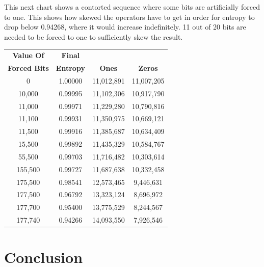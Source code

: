 \documentclass[letterpaper]{article}
\begin{document}
\begin{multicols}{2}
    This next chart shows a contorted sequence where some bits are artificially forced to one. This shows how skewed the operators have to get in order for entropy to drop below 0.94268, where it would increase indefinitely. 11 out of 20 bits are needed to be forced to one to sufficiently skew the result.

    \noindent
    \begin{minipage}{\columnwidth}
        \setlength{\tabcolsep}{.35\tabcolsep}
        \centering
        \begin{tabular}{|c|c|c|c|}
            \hline
            \textbf{Value Of}    & \textbf{Final}   &               &                \\
            \textbf{Forced Bits} & \textbf{Entropy} & \textbf{Ones} & \textbf{Zeros} \\
            \hline
            0                    & 1.00000          & 11,012,891    & 11,007,205     \\
            10,000               & 0.99995          & 11,102,306    & 10,917,790     \\
            11,000               & 0.99971          & 11,229,280    & 10,790,816     \\
            11,100               & 0.99931          & 11,350,975    & 10,669,121     \\
            11,500               & 0.99916          & 11,385,687    & 10,634,409     \\
            15,500               & 0.99892          & 11,435,329    & 10,584,767     \\
            55,500               & 0.99703          & 11,716,482    & 10,303,614     \\
            155,500              & 0.99727          & 11,687,638    & 10,332,458     \\
            175,500              & 0.98541          & 12,573,465    & 9,446,631      \\
            177,500              & 0.96792          & 13,323,124    & 8,696,972      \\
            177,700              & 0.95400          & 13,775,529    & 8,244,567      \\
            177,740              & 0.94266          & 14,093,550    & 7,926,546      \\
            \hline
        \end{tabular}
    \end{minipage}

    \section{Conclusion}


\end{multicols}
\end{document}

